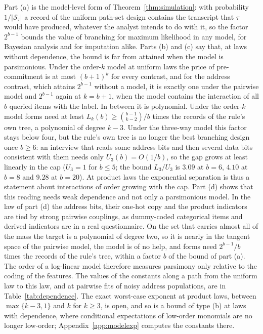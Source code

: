 Part (a) is the model-level form of Theorem~\ref{thm:simulation}: with
probability $1/|\mathcal S_\tau|$ a record of the uniform path-set design
contains the transcript that $\tau$ would have produced, whatever the analyst
intends to do with it, so the factor $2^{b-1}$ bounds the value of branching
for maximum likelihood in any model, for Bayesian analysis and for
imputation alike. Parts (b) and (c) say that, at laws without dependence,
the bound is far from attained when the model is parsimonious. Under the
order-$k$ model at uniform laws the price of pre-commitment is at most
$(b+1)^k$ for every contrast, and for the address contrast, which attains
$2^{b-1}$ without a model, it is exactly one under the pairwise model and
$2^{b-1}$ again at $k=b+1$, when the model contains the interaction of all
$b$ queried items with the label. In between it is polynomial. Under the
order-$k$ model forms need at least $L_k(b)\ge\binom{b-1}{k-2}/b$ times the
records of the rule's own tree, a polynomial of degree $k-3$. Under the
three-way model this factor stays below four, but the rule's own tree is no
longer the best branching design once $b\ge6$: an interview that reads some
address bits and then several data bits consistent with them needs only
$U_3(b)=O(1/b)$, so the gap grows at least linearly in the cap ($U_3=1$ for
$b\le5$; the bound $L_3/U_3$ is $3.09$ at $b=6$, $4.10$ at $b=8$ and $9.28$ at
$b=20$). At product laws the exponential separation is thus a statement about
interactions of order growing with the cap. Part (d) shows that this reading
needs weak dependence and not only a parsimonious model. In the law of part
(d) the address bits, their one-hot copy and the product indicators are tied
by strong pairwise couplings, as dummy-coded categorical items and derived
indicators are in a real questionnaire. On the set that carries almost all of
the mass the target is a polynomial of degree two, so it is nearly in the
tangent space of the pairwise model, the model is of no help, and forms need $2^{b-1}/b$ times the records
of the rule's tree, within a factor $b$ of the bound of part (a). The order
of a log-linear model therefore measures parsimony only relative to the
coding of the features. The values of the constants along a path from the
uniform law to this law, and at pairwise fits of noisy address populations,
are in Table~\ref{tab:dependence}. The exact worst-case exponent at product laws,
between $\max\{k-3,1\}$ and $k$ for $k\ge3$, is open, and so is a bound of
type (b) at laws with dependence, where conditional expectations of
low-order monomials are no longer low-order; Appendix~\ref{app:modelexp}
computes the constants there.

